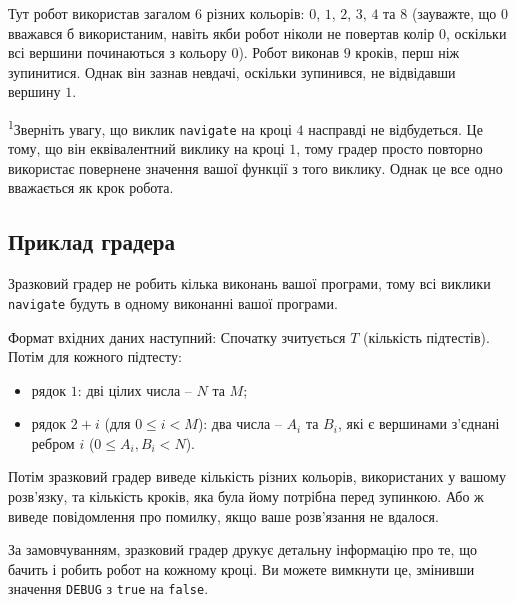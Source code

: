 \documentclass[12pt]{article}
\begin{document}
Тут робот використав загалом $6$ різних кольорів: $0$, $1$, $2$, $3$, $4$ та $8$ (зауважте, що $0$ вважався б використаним, навіть якби робот ніколи не повертав колір $0$, оскільки всі вершини починаються з кольору $0$). Робот виконав $9$ кроків, перш ніж зупинитися. Однак він зазнав невдачі, оскільки зупинився, не відвідавши вершину $1$.

\textsuperscript{1}Зверніть увагу, що виклик \texttt{navigate} на кроці $4$ насправді не відбудеться. Це тому, що він еквівалентний виклику на кроці $1$, тому градер просто повторно використає повернене значення вашої функції з того виклику. Однак це все одно вважається як крок робота.
\subsection{Приклад градера}

Зразковий градер не робить кілька виконань вашої програми, тому всі виклики \texttt{navigate} будуть в одному виконанні вашої програми.

Формат вхідних даних наступний: Спочатку зчитується $T$ (кількість підтестів). Потім для кожного підтесту:
\begin{itemize}
\item рядок $1$: дві цілих числа -- $N$ та $M$;
\item рядок $2+i$ (для $0 \leq i < M$): два числа -- $A_i$ та $B_i$, які є вершинами з'єднані ребром $i$ ($0 \leq A_i, B_i < N$).
\end{itemize}

Потім зразковий градер виведе кількість різних кольорів, використаних у вашому розв'язку, та кількість кроків, яка була йому потрібна перед зупинкою. Або ж виведе повідомлення про помилку, якщо ваше розв'язання не вдалося.

За замовчуванням, зразковий градер друкує детальну інформацію про те, що бачить і робить робот на кожному кроці. Ви можете вимкнути це, змінивши значення \texttt{DEBUG} з \texttt{true} на \texttt{false}.
\end{document}
